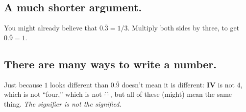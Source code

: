 \documentclass[11pt]{handout}
\begin{document}
\subsection*{A much shorter argument.}

You might already believe that $0.\overline{3} = 1/3$.  Multiply both
sides by three, to get $0.\overline{9} = 1$.

\subsection*{There are many ways to write a number.}

Just because $1$ looks different than $0.\overline{9}$ doesn't mean it
is different: \textbf{IV} is not $4$, which is not ``four,'' which is
not $\stackrel{\cdot \cdot}{\cdot \cdot}$, but all of these (might) mean the same
thing.  \textit{The signifier is not the signified.}
\end{document}
